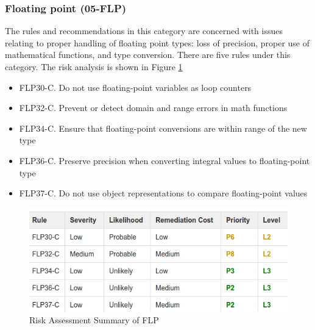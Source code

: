 \subsubsection{Floating point (05-FLP)} The rules and recommendations in this category are concerned with issues relating to proper handling of floating point types: loss of precision, proper use of mathematical functions, and type conversion. There are five  rules under this category. The risk analysis is shown in Figure \ref{fig:6}\cite{cert-c}
\begin{itemize}
	\item FLP30-C. Do not use floating-point variables as loop counters
	
	\item FLP32-C. Prevent or detect domain and range errors in math functions
	
	\item FLP34-C. Ensure that floating-point conversions are within range of the new type
	
	\item FLP36-C. Preserve precision when converting integral values to floating-point type
	
	\item FLP37-C. Do not use object representations to compare floating-point values
\end{itemize}
\begin{figure}[H]
	
	
	\centering
	\includegraphics[width=.6\linewidth]{Figures/flp}
	\caption{Risk Assessment Summary of FLP}
	\label{fig:6}
	
\end{figure}
